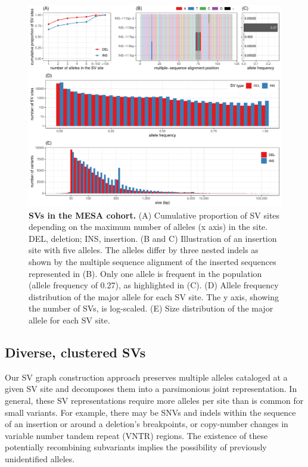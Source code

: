 \documentclass[11pt]{ucscthesis}
\begin{document}
\begin{figure}
    \centering
    \includegraphics[width=\linewidth]{aim2_fig5.pdf}
    \caption[SVs in the MESA cohort]{\textbf{SVs in the MESA cohort.} (A) Cumulative proportion of SV sites depending on the maximum number of alleles (x axis) in the site. DEL, deletion; INS, insertion. (B and C) Illustration of an insertion site with five alleles. The alleles differ by three nested indels as shown by the multiple sequence alignment of the inserted sequences represented in (B). Only one allele is frequent in the population (allele frequency of 0.27), as highlighted in (C). (D) Allele frequency distribution of the major allele for each SV site. The y axis, showing the number of SVs, is log-scaled. (E) Size distribution of the major allele for each SV site.}
    \label{fig:aim2_fig5}
\end{figure}

\subsection{Diverse, clustered SVs}
Our SV graph construction approach preserves multiple alleles cataloged at a given SV site and decomposes them into a parsimonious joint representation.
In general, these SV representations require more alleles per site than is common for small variants.
For example, there may be SNVs and indels within the sequence of an insertion or around a deletion’s breakpoints, or copy-number changes in variable number tandem repeat (VNTR) regions.
The existence of these potentially recombining subvariants implies the possibility of previously unidentified alleles.
\end{document}
